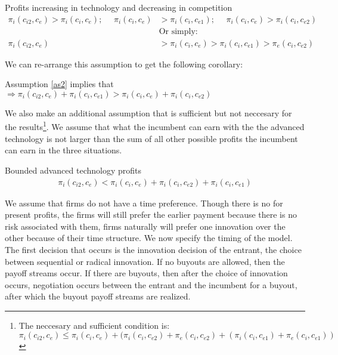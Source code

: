 \begin{assumption}{Profits increasing in technology and decreasing in competition}\label{as2}
\begin{align*}
\pi_{i}(c_{i2},c_{e})>\pi_{i}(c_{i},c_{e}); ~~~~~~ \pi_{i}(c_{i},c_{e})&> \pi_{i}(c_{i},c_{e1}); ~~~~~~ \pi_{i}(c_{i},c_{e})>\pi_{i}(c_{i},c_{e2}) \\
&\text{Or simply:} \\
\pi_{i}(c_{i2},c_{e})&>\pi_{i}(c_{i},c_{e})>\pi_{i}(c_{i},c_{e1})>\pi_{e}(c_{i},c_{e2})
\end{align*}
\end{assumption} 
We can re-arrange this assumption to get the following corollary: 
\begin{corollary}\label{cor}
Assumption \ref{as2} implies that $\Rightarrow \pi_{i}(c_{i2},c_{e}) + \pi_{i}(c_{i},c_{e1}) > \pi_{i}(c_{i},c_{e}) + \pi_{i}(c_{i},c_{e2}) $ 
\end{corollary}
We also make an additional assumption that is sufficient but not neccesary for the results\footnote{The neccesary and sufficient condition is: $\pi_{i}(c_{i2},c_{e}) \leq \pi_{i}(c_{i},c_{e})+(\pi_{i}(c_{i},c_{e2}) + \pi_{e}(c_{i},c_{e2})+(\pi_{i}(c_{i},c_{e1}) + \pi_{e}(c_{i},c_{e1}))$}. We assume that what the incumbent can earn with the the advanced technology is not larger than the sum of all other possible profits the incumbent can earn in the three situations. 
\begin{assumption}{Bounded advanced technology profits}\label{as3}
\begin{align*}
\pi_{i}(c_{i2},c_{e})<\pi_{i}(c_{i},c_{e})+ \pi_{i}(c_{i},c_{e2})+ \pi_{i}(c_{i},c_{e1})
\end{align*}
\end{assumption} 
We assume that firms do not have a time preference. Though there is no  for present profits, the firms will still prefer the earlier payment because there is no risk associated with them, firms naturally will prefer one innovation over the other because of their time structure. 
We now specify the timing of the model. The first decision that occurs is the innovation decision of the entrant, the choice between sequential or radical innovation. If no buyouts are allowed, then the payoff streams occur. If there are buyouts, then after the choice of innovation occurs, negotiation occurs between the entrant and the incumbent for a buyout, after which the buyout payoff streams are realized.
